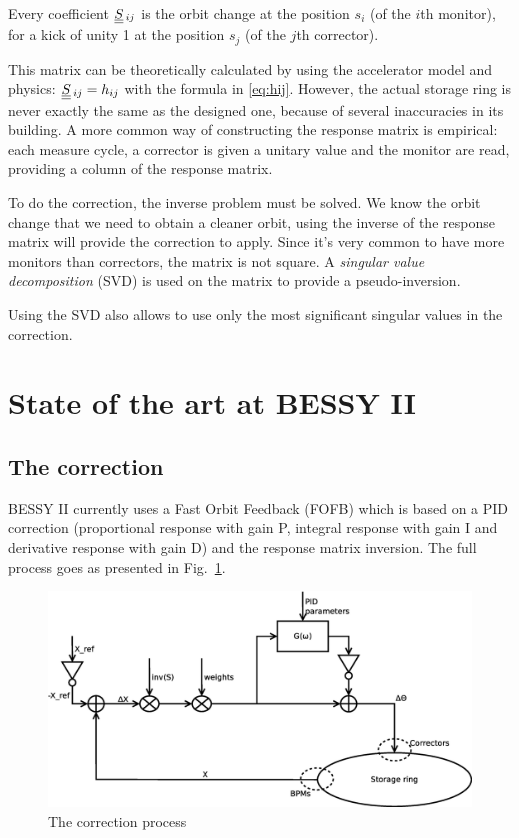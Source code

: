 Every coefficient $\underline{\underline{S}}\,_{ij}$ is the orbit change at the position $s_i$ (of the $i$th monitor), for a kick of unity 1 at the position $s_j$ (of the $j$th corrector).

This matrix can be theoretically calculated by using the accelerator model and physics: $\underline{\underline{S}}\,_{ij} = h_{ij}$ with the formula in \eqref{eq:hij}. However, the actual storage ring is never exactly the same as the designed one, because of several inaccuracies in its building. A more common way of constructing the response matrix is empirical: each measure cycle, a corrector is given a unitary value and the monitor are read, providing a column of the response matrix.

To do the correction, the inverse problem must be solved. We know the orbit change that we need to obtain a cleaner orbit, using the inverse of the response matrix will provide the correction to apply. Since it's very common to have more monitors than correctors, the matrix is not square. A \emph{singular value decomposition} (SVD) is used on the matrix to provide a pseudo-inversion.

Using the SVD also allows to use only the most significant singular values in the correction.

\section{State of the art at BESSY II}

\subsection{The correction}
BESSY II currently uses a Fast Orbit Feedback (FOFB) which is based on a PID correction (proportional response with gain P, integral response with gain I and derivative response with gain D) and the response matrix inversion. The full process goes as presented in Fig.~\ref{fig:block_correction}.

\begin{figure}[!h]
    \centering
    \includegraphics[width=.85\linewidth]{img/correction}
    \caption{\label{fig:block_correction}The correction process}
\end{figure}

